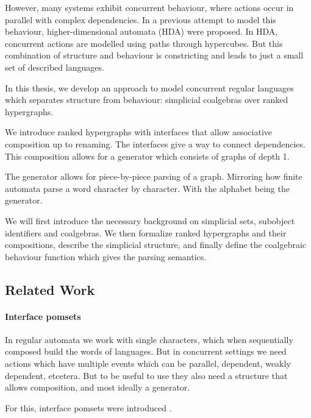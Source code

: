 \documentclass[12pt]{article}
\theoremstyle{definition}
\newcommand{\1}{\mathbbm{1}}
\begin{document}
However, many systems exhibit concurrent behaviour, where actions occur in parallel with complex dependencies. In a previous attempt to model this behaviour, higher-dimensional automata (HDA) were proposed. In HDA, concurrent actions are modelled using paths through hypercubes. But this combination of structure and behaviour is constricting and leads to just a small set of described languages.

In this thesis, we develop an approach to model concurrent regular languages which separates structure from behaviour: simplicial coalgebras over ranked hypergraphs. 

We introduce ranked hypergraphs with interfaces that allow associative composition up to renaming. The interfaces give a way to connect dependencies. This composition allows for a generator which consists of graphs of depth 1. 

The generator allows for piece-by-piece parsing of a graph. Mirroring how finite automata parse a word character by character. With the alphabet being the generator.

We will first introduce the necessary background on simplicial sets, subobject identifiers and coalgebras. We then formalize ranked hypergraphs and their compositions, describe the simplicial structure, and finally define the coalgebraic behaviour function which gives the parsing semantics.

\subsection{Related Work}

\paragraph{Interface pomsets}
In regular automata we work with single characters, which when sequentially composed build the words of languages. But in concurrent settings we need actions which have multiple events which can be parallel, dependent, weakly dependent, etcetera. But to be useful to use they also need a structure that allows composition, and most ideally a generator.

For this, interface pomsets were introduced \cite{ipomsets2024}. 
\end{document}
